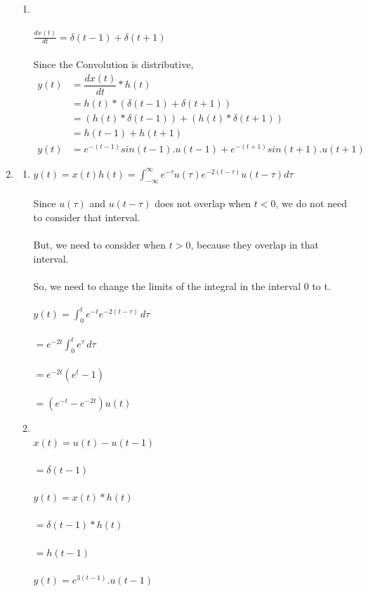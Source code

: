 \documentclass[10pt,a4paper, margin=1in]{article}
\begin{document}
\begin{enumerate}
\begin{enumerate}
    \item %
        \\\\ $\frac{dx(t)}{dt} = \delta(t-1) + \delta(t+1)$
        \\\\ Since the Convolution is distributive, 
        \begin{align*}
            y(t) &= \dfrac{dx(t)}{dt} * h(t)
            \\ &= h(t) * ( \delta(t-1) + \delta(t+1))
            \\ &= (h(t) *\delta(t-1)) + (h(t) *\delta(t+1))
            \\ &= h(t-1) + h(t+1) 
            \\ y(t) &= e^{-(t-1)}sin(t-1) . u(t-1) + e^{-(t+1)}sin(t+1) . u(t+1)
        \end{align*}
    \end{enumerate}

\item %
    \begin{enumerate}
        \item %
        $y(t) = x(t)h(t) = \int_{-\infty}^{\infty}e^{-\tau}u(\tau)e^{-2(t-\tau)}u(t-\tau)d\tau$
        \\\\ Since $u(\tau)$ and $u(t-\tau)$ does not overlap when $t<0$, we do not need to consider that interval.
        \\\\ But, we need to consider when $t>0$, because they overlap in that interval. 
        \\\\ So, we need to change the limits of the integral in the interval 0 to t.
        \\\\ $y(t) = \int_{0}^{t}e^{-t}e^{-2(t-\tau)}\,d\tau$
        \\\\ $= e^{-2t} \int_{0}^{t}e^{\tau}\,d\tau$
        \\\\ $=e^{-2t}(e^{t} -1)$
        \\\\ $=(e^{-t} - e^{-2t})u(t)$
        \\
        \item %
        \\$x(t) = u(t) - u(t-1)$
        \\\\ $ = \delta(t-1)$
        \\\\ $y(t) = x(t) * h(t)$
        \\\\ $= \delta(t-1) * h(t)$
        \\\\ $= h(t-1)$
        \\\\ $y(t) = e^{3(t-1)} . u(t-1)$
        \\\\
    \end{enumerate}


\end{enumerate}
\end{document}
